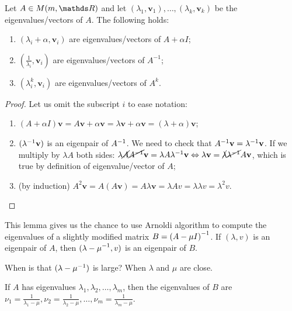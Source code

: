 \documentclass[ComputationalMathematics.tex]{subfiles}
\begin{document}
\begin{lemma}
  Let $A \in M(m, \R)$ and let $(\lambda_1,\mathbf{v}_1),\dots,(\lambda_k,\mathbf{v}_k)$ be the eigenvalues/vectors of $A$. The following holds:

\begin{enumerate}
    \item $(\lambda_i+\alpha, \mathbf{v}_i)$ are eigenvalues/vectors of $A+\alpha I$;
    \item $(\frac{1}{\lambda_i}, \mathbf{v}_i)$ are eigenvalues/vectors of $A^{-1}$;
    \item $(\lambda_i^k, \mathbf{v}_i)$ are eigenvalues/vectors of $A^k$.
\end{enumerate}
\end{lemma}
\begin{proof}
  Let us omit the subscript $i$ to ease notation:~\\
  \begin{enumerate}
    \item $(A + \alpha I)\mathbf{v} = A \mathbf{v} + \alpha \mathbf{v} = \lambda \mathbf{v} + \alpha \mathbf{v} = (\lambda + \alpha) \mathbf{v}$;
    \item $({\lambda}^{-1} \mathbf{v})$ is an eigenpair of ${A}^{-1}$. We need to check that ${A}^{-1} \mathbf{v} = {\lambda}^{-1} \mathbf{v}$. If we multiply by $\lambda A$ both sides: $\lambda \cancel{A} \cancel{{A}^{-1}} \mathbf{v} = \lambda A {\lambda}^{-1} \mathbf{v} \Leftrightarrow \lambda \mathbf{v} = \cancel{\lambda} \cancel{{\lambda}^{-1}} A \mathbf{v}$, which is true by definition of eigenvalue/vector of $A$;
    \item (by induction) $A^2 \mathbf{v} = A (A\mathbf{v}) = A \lambda \mathbf{v} = \lambda A v = \lambda \lambda v = {\lambda}^2 v $.
  \end{enumerate}
\end{proof}

This lemma gives us the chance to use Arnoldi algorithm to compute the eigenvalues of a slightly modified matrix $B = {(A -\mu I)}^{-1}$.
If $(\lambda, v)$ is an eigenpair of $A$, then $( {\lambda - \mu}^{-1}, v)$ is an eigenpair of $B$.

When is that $(\lambda - {\mu}^{-1})$ is large? When $\lambda$ and $\mu$ are close.

If $A$ has eigenvalues $\lambda_1, \lambda_2, \ldots, \lambda_m$, then the eigenvalues of $B$ are $\nu_1 = \frac{1}{\lambda_1 - \mu}, \nu_2 = \frac{1}{\lambda_2 - \mu}, \ldots, \nu_m = \frac{1}{\lambda_m - \mu}$.
\end{document}
